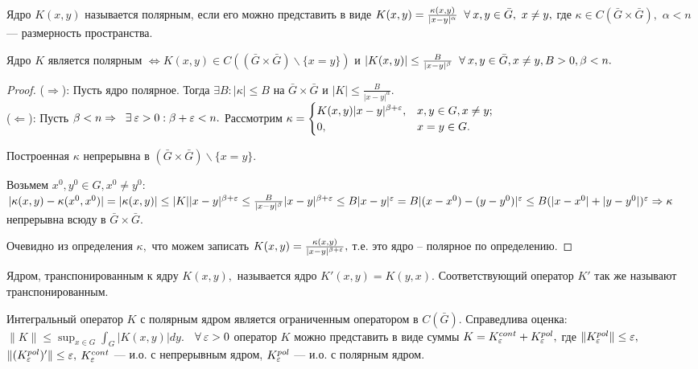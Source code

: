 \begin{definition}
Ядро $K(x,y)$ называется полярным, если его можно представить в виде $K(x,y) = \frac{\kappa(x,y)}{|x-y|^\alpha} \;\;\forall\: x,y \in \bar G,\ x\ne y,$ где $\kappa \in C(\bar G \times \bar G),$ $\alpha < n$ --- размерность пространства.
\end{definition}

\begin{lemma}
Ядро $K$ является полярным $\Leftrightarrow K(x,y) \in C((\bar G \times \bar G)\backslash\{x=y\})$ и $|K(x,y)| \le \frac{B}{|x-y|^\beta} \;\;\forall\: x, y \in \bar G, x \ne y, B>0, \beta < n.$
\end{lemma}

\begin{proof}
($\Rightarrow$): Пусть ядро полярное. Тогда $\exists B: |\kappa| \le B$ на $\bar G \times \bar G$ и $|K| \le \frac{B}{|x-y|^\alpha}.$
\\
($\Leftarrow$): Пусть $\beta < n \Rightarrow \;\;\exists\: \varepsilon > 0: \beta+\varepsilon < n.$ Рассмотрим $\kappa =  \begin{cases}
   K(x,y)|x-y|^{\beta+\varepsilon}, &x,y\in G, x\ne y;\\
   0, & x=y\in G.
 \end{cases}
$

Построенная $\kappa$ непрерывна в $(\bar G \times \bar G)\backslash\{x=y\}.$

Возьмем $x^0,y^0 \in G, x^0 \ne y^0:$
$|\kappa(x,y) - \kappa(x^0, x^0)| = |\kappa(x,y)| \le |K||x-y|^{\beta+\varepsilon} \le \frac{B}{|x-y|^\beta}|x-y|^{\beta+\varepsilon}\le B|x-y|^\varepsilon = B|(x-x^0)-(y-y^0)|^\varepsilon \le B(|x-x^0|+|y-y^0|)^\varepsilon \Rightarrow \kappa$ непрерывна всюду в $\bar G \times \bar G.$

Очевидно из определения $\kappa,$ что можем записать $K(x,y) = \frac{\kappa(x,y)}{|x-y|^{\beta+\varepsilon}},$ т.е. это ядро -- полярное по определению.
\end{proof}


\begin{definition}
Ядром, транспонированным к ядру $K(x,y),$ называется ядро $K'(x,y) = K(y,x).$ Соответствующий оператор $K'$ так же называют транспонированным.
\end{definition}

\begin{theorem}
Интегральный оператор $K$ с полярным ядром является ограниченным оператором в $C(\bar G).$ Справедлива оценка: $\|K\| \le \sup_{x\in G}\int_G|K(x,y)|dy.$ $\;\;\forall\: \varepsilon > 0$ оператор $K$ можно представить в виде суммы $K = K_\varepsilon^{cont}+K_\varepsilon^{pol},$ где $\|K_\varepsilon^{pol}\| \le \varepsilon,$ $\|(K_\varepsilon^{pol})'\| \le \varepsilon,$ $K_\varepsilon^{cont}$ --- и.о. с непрерывным ядром, $K_\varepsilon^{pol}$ --- и.о. с полярным ядром.
\end{theorem}

